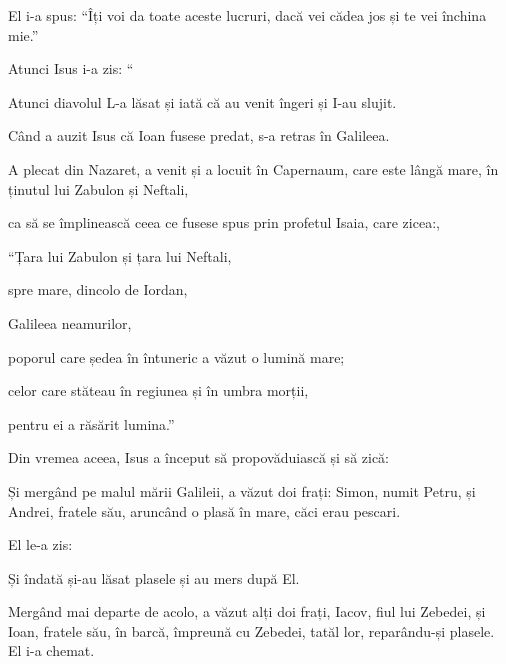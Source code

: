 {El i-a spus: “Îți voi da toate aceste lucruri, dacă vei cădea jos și te vei închina mie.”


\par }{\PP {}Atunci Isus i-a zis: “{}


\par }{\PP {}Atunci diavolul L-a lăsat și iată că au venit îngeri și I-au slujit.


\par }{\PP {}Când a auzit Isus că Ioan fusese predat, s-a retras în Galileea.

A plecat din Nazaret, a venit și a locuit în Capernaum, care este lângă mare, în ținutul lui Zabulon și Neftali,

ca să se împlinească ceea ce fusese spus prin profetul Isaia, care zicea:,


\par }{\Q {}“Țara lui Zabulon și țara lui Neftali,

\par }{\QB spre mare, dincolo de Iordan,

\par }{\QB Galileea neamurilor,


\par }{\Q {}poporul care ședea în întuneric a văzut o lumină mare;

\par }{\QB celor care stăteau în regiunea și în umbra morții,

\par }{\QB pentru ei a răsărit lumina.”


\par }{\PP {}Din vremea aceea, Isus a început să propovăduiască și să zică:
{}


\par }{\PP {}Și mergând pe malul mării Galileii, a văzut doi frați: Simon, numit Petru, și Andrei, fratele său, aruncând o plasă în mare, căci erau pescari.

El le-a zis:
{}


\par }{\PP {}Și îndată și-au lăsat plasele și au mers după El.

Mergând mai departe de acolo, a văzut alți doi frați, Iacov, fiul lui Zebedei, și Ioan, fratele său, în barcă, împreună cu Zebedei, tatăl lor, reparându-și plasele. El i-a chemat.

}
